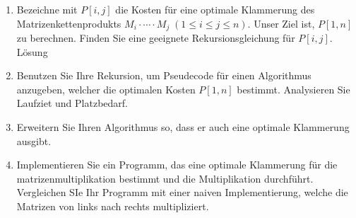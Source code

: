 \documentclass[11pt,a4paper,ngerman]{article}
\begin{document}
\begin{enumerate}[\bfseries (a)]


\item Bezeichne mit $P[i,j]$ die Kosten für eine optimale Klammerung des Matrizenkettenprodukts $M_i \cdot \cdots \cdot M_j \; ( 1 \leq i \leq j \leq n)$. Unser Ziel ist, $P[1,n]$ zu berechnen. Finden Sie eine geeignete Rekursionsgleichung für $P[i,j]$.\\
Lösung

\item Benutzen Sie Ihre Rekursion, um Pseudecode für einen Algorithmus anzugeben, welcher die optimalen Kosten $P[1,n]$ bestimmt. Analysieren Sie Laufziet und Platzbedarf.


\item Erweitern Sie Ihren Algorithmus so, dass er auch eine optimale Klammerung ausgibt.\\


\item Implementieren Sie ein Programm, das eine optimale Klammerung für die matrizenmultiplikation bestimmt und die Multiplikation durchführt. Vergleichen SIe Ihr Programm mit einer naiven Implementierung, welche die Matrizen von links nach rechts multipliziert.

\end{enumerate}

\label{LastPage}
\end{document}
